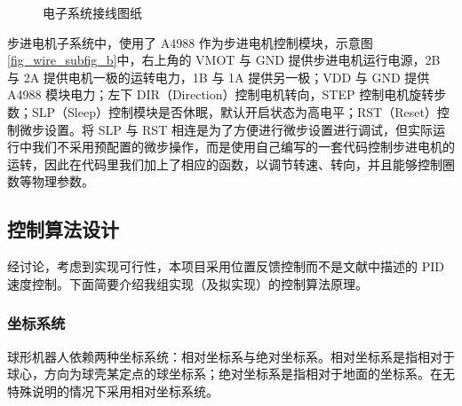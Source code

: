 \documentclass[a4paper]{ctexart}
\numberwithin{equation}{section}
\numberwithin{table}{section}
\numberwithin{figure}{section}
\begin{document}
\begin{figure}[H]
  \centering
  \hfill
  \caption{电子系统接线图纸}
  \label{fig_wire}
\end{figure}


步进电机子系统中，使用了 A4988 作为步进电机控制模块，示意图\ref{fig_wire_subfig_b}中，右上角的 VMOT 与 GND 提供步进电机运行电源，2B 与 2A 提供电机一极的运转电力，1B 与 1A 提供另一极；VDD 与 GND 提供 A4988 模块电力；左下 DIR（Direction）控制电机转向，STEP 控制电机旋转步数；SLP（Sleep）控制模块是否休眠，默认开启状态为高电平；RST（Reset）控制微步设置。将 SLP 与 RST 相连是为了方便进行微步设置进行调试，但实际运行中我们不采用预配置的微步操作，而是使用自己编写的一套代码控制步进电机的运转，因此在代码里我们加上了相应的函数，以调节转速、转向，并且能够控制圈数等物理参数。

\subsection{控制算法设计}

经讨论，考虑到实现可行性，本项目采用位置反馈控制而不是文献中描述的 PID 速度控制。下面简要介绍我组实现（及拟实现）的控制算法原理。

\subsubsection{坐标系统}

球形机器人依赖两种坐标系统：相对坐标系与绝对坐标系。相对坐标系是指相对于球心，方向为球壳某定点的球坐标系；绝对坐标系是指相对于地面的坐标系。在无特殊说明的情况下采用相对坐标系统。
\end{document}
